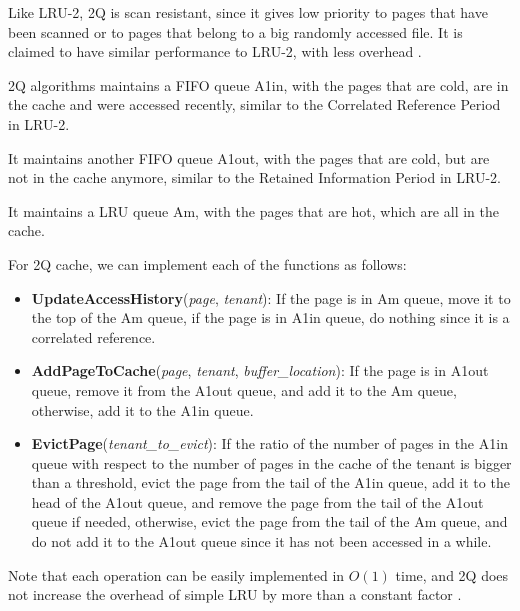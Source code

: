 Like LRU-2, 2Q is scan resistant, since it gives low priority to pages that have been
scanned or to pages that belong to a big randomly accessed file. It
is claimed to have similar performance to LRU-2, with less overhead \cite{2q-article}.

2Q algorithms maintains a FIFO queue A1in, with the pages that are cold, are in the cache
and were accessed recently, similar to the Correlated Reference Period in LRU-2.

It maintains another FIFO queue A1out, with the pages that are cold, but are not in 
the cache anymore, similar to the Retained Information Period in LRU-2.

It maintains a LRU queue Am, with the pages that are hot, which are all in the cache.

For 2Q cache, we can implement each of the functions as follows:

\begin{itemize}
    \item \textbf{UpdateAccessHistory}(\textit{page}, \textit{tenant}): If the page is 
    in Am queue, move it to the top of the Am queue, if the page is in A1in queue, do
    nothing since it is a correlated reference.
    \item \textbf{AddPageToCache}(\textit{page}, \textit{tenant}, \textit{buffer\_location}): If
    the page is in A1out queue, remove it from the A1out queue, and add it to the Am queue,
    otherwise, add it to the A1in queue.
    \item \textbf{EvictPage}(\textit{tenant\_to\_evict}): If the ratio of the number of pages
    in the A1in queue with respect to the number of pages in the cache of the tenant is bigger
    than a threshold, evict the page from the tail of the A1in queue, add it to the head of the
    A1out queue, and remove the page from the tail of the A1out queue if needed, otherwise, evict
    the page from the tail of the Am queue, and do not add it to the A1out queue since it has not
    been accessed in a while.
\end{itemize}

Note that each operation can be easily implemented in $O(1)$ time, and 2Q does not increase 
the overhead of simple LRU by more than a constant factor \cite{2q-article}.

